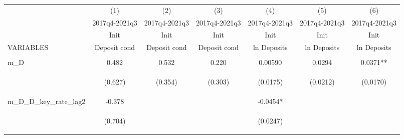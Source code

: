 \documentclass[]{article}
\begin{document}
\begin{center}
\begin{tabular}{lcccccc} \hline
 & (1) & (2) & (3) & (4) & (5) & (6) \\
 & 2017q4-2021q3 & 2017q4-2021q3 & 2017q4-2021q3 & 2017q4-2021q3 & 2017q4-2021q3 & 2017q4-2021q3 \\
 & Init & Init & Init & Init & Init & Init \\
VARIABLES & Deposit cond & Deposit cond & Deposit cond & ln Deposits & ln Deposits & ln Deposits \\ \hline
\vspace{4pt} & \begin{footnotesize}\end{footnotesize} & \begin{footnotesize}\end{footnotesize} & \begin{footnotesize}\end{footnotesize} & \begin{footnotesize}\end{footnotesize} & \begin{footnotesize}\end{footnotesize} & \begin{footnotesize}\end{footnotesize} \\
m\_D & 0.482 & 0.532 & 0.220 & 0.00590 & 0.0294 & 0.0371** \\
\vspace{4pt} & \begin{footnotesize}(0.627)\end{footnotesize} & \begin{footnotesize}(0.354)\end{footnotesize} & \begin{footnotesize}(0.303)\end{footnotesize} & \begin{footnotesize}(0.0175)\end{footnotesize} & \begin{footnotesize}(0.0212)\end{footnotesize} & \begin{footnotesize}(0.0170)\end{footnotesize} \\
m\_D\_D\_key\_rate\_lag2 & -0.378 &  &  & -0.0454* &  &  \\
\vspace{4pt} & \begin{footnotesize}(0.704)\end{footnotesize} & \begin{footnotesize}\end{footnotesize} & \begin{footnotesize}\end{footnotesize} & \begin{footnotesize}(0.0247)\end{footnotesize} & \begin{footnotesize}\end{footnotesize} & \begin{footnotesize}\end{footnotesize} \\

\end{tabular}
\end{center}
\end{document}
